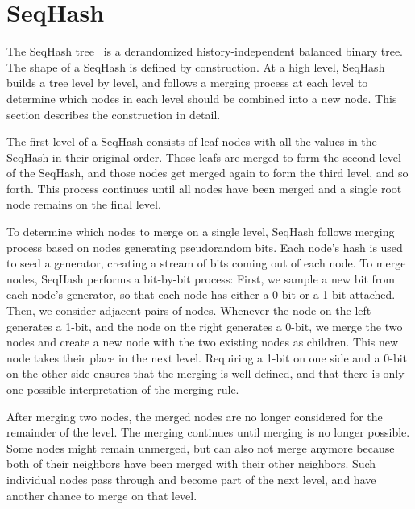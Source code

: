 \section{SeqHash}
\label{s:background}

The SeqHash tree~\cite{versum:ccs14} is a derandomized history-independent
balanced binary tree. %
The shape of a SeqHash is defined by construction. At a high level, SeqHash
builds a tree level by level, and follows a merging process at each level
to determine which nodes in each level should be combined into a new node.
This section describes the construction in detail.

The first level of a SeqHash consists of leaf nodes with all the values in the
SeqHash in their original order.  Those leafs are merged to form the second
level of the SeqHash, and those nodes get merged again to form the third level,
and so forth. This process continues until all nodes have been merged and a
single root node remains on the final level.


To determine which nodes to merge on a single level, SeqHash follows merging
process based on nodes generating pseudorandom bits. Each node's hash is used
to seed a generator, creating a stream of bits coming out of each node.  To
merge nodes, SeqHash performs a bit-by-bit process: First, we sample a new bit
from each node's generator, so that each node has either a 0-bit or a 1-bit
attached. Then, we consider adjacent pairs of nodes.  Whenever the node on the
left generates a 1-bit, and the node on the right generates a 0-bit, we merge
the two nodes and create a new node with the two existing nodes as children.
This new node takes their place in the next level. Requiring a 1-bit on one
side and a 0-bit on the other side ensures that the merging is well defined,
and that there is only one possible interpretation of the merging rule.

After merging two nodes, the merged nodes are no longer considered for the
remainder of the level. The merging continues until merging is no longer possible.
Some nodes might remain unmerged, but can also not merge anymore because both
of their neighbors have been merged with their other neighbors. Such individual
nodes pass through and become part of the next level, and have another chance
to merge on that level.

